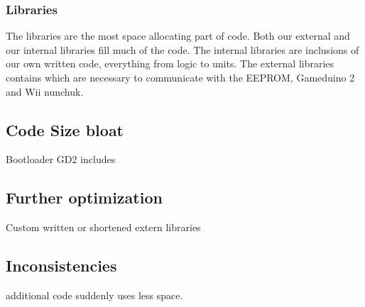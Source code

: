 \subsubsection{Libraries}
The libraries are the most space allocating part of code. Both our external and
our internal libraries fill much of the code. The internal libraries are
inclusions of our own written code, everything from logic to units. The external
libraries contains which are necessary to communicate with the EEPROM,
Gameduino 2 and Wii nunchuk.

\subsection{Code Size bloat} Bootloader GD2 includes \subsection{Further
optimization} Custom written or shortened extern libraries

\subsection{Inconsistencies} %
additional code suddenly uses less space.
